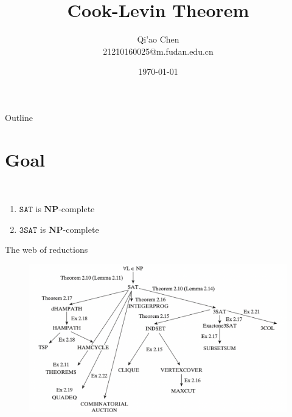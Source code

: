 \documentclass[presentation]{beamer}
\author{Qi'ao Chen\\21210160025@m.fudan.edu.cn}
\date{\today}
\title{Cook-Levin Theorem}
\def \NP {\textbf{NP}}
\def \NP {\textbf{NP}}
\def \SAT {\texttt{SAT}}
\def \TSAT {\texttt{3SAT}}
\begin{document}
\maketitle
\begin{frame}{Outline}
\tableofcontents
\end{frame}

\section{Goal}
\label{sec:orgb52ab98}
\begin{frame}[label={sec:org7f66a30}]{​​}
\begin{theorem}
\begin{enumerate}
\item \(\SAT\) is \(\NP\)-complete
\item \(\TSAT\) is \(\NP\)-complete
\end{enumerate}
\end{theorem}
\end{frame}


\begin{frame}[label={sec:org14b6eb5}]{The web of reductions}
\begin{figure}[htbp]
\centering
\includegraphics[width=.8\textwidth]{./3.pdf}
\label{}
\end{figure}
\end{frame}
\end{document}
